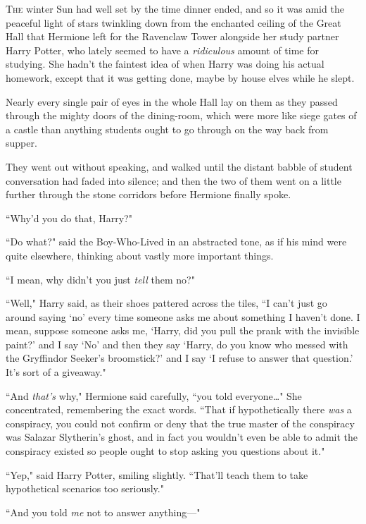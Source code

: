 
\lettrine{T}{he} winter Sun had well set by the time dinner ended, and so it was amid the peaceful light of stars twinkling down from the enchanted ceiling of the Great Hall that Hermione left for the Ravenclaw Tower alongside her study partner Harry Potter, who lately seemed to have a \emph{ridiculous} amount of time for studying. She hadn't the faintest idea of when Harry was doing his actual homework, except that it was getting done, maybe by house elves while he slept.

Nearly every single pair of eyes in the whole Hall lay on them as they passed through the mighty doors of the dining-room, which were more like siege gates of a castle than anything students ought to go through on the way back from supper.

They went out without speaking, and walked until the distant babble of student conversation had faded into silence; and then the two of them went on a little further through the stone corridors before Hermione finally spoke.

``Why'd you do that, Harry?"

``Do what?" said the Boy-Who-Lived in an abstracted tone, as if his mind were quite elsewhere, thinking about vastly more important things.

``I mean, why didn't you just \emph{tell} them no?"

``Well," Harry said, as their shoes pattered across the tiles, ``I can't just go around saying `no' every time someone asks me about something I haven't done. I mean, suppose someone asks me, `Harry, did you pull the prank with the invisible paint?' and I say `No' and then they say `Harry, do you know who messed with the Gryffindor Seeker's broomstick?' and I say `I refuse to answer that question.' It's sort of a giveaway."

``And \emph{that's} why," Hermione said carefully, ``you told everyone{\ldots}" She concentrated, remembering the exact words. ``That if hypothetically there \emph{was} a conspiracy, you could not confirm or deny that the true master of the conspiracy was Salazar Slytherin's ghost, and in fact you wouldn't even be able to admit the conspiracy existed so people ought to stop asking you questions about it."

``Yep," said Harry Potter, smiling slightly. ``That'll teach them to take hypothetical scenarios too seriously."

``And you told \emph{me} not to answer anything—"

